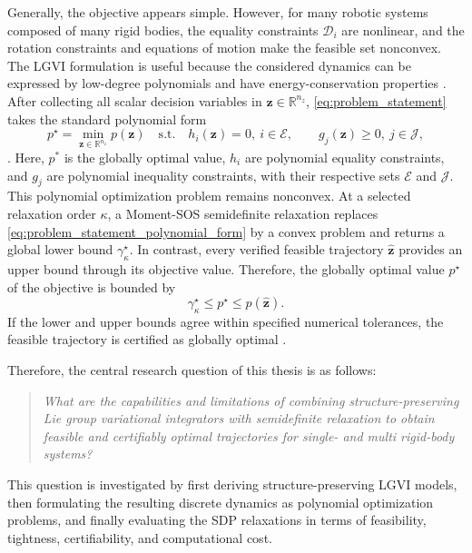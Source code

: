 Generally, the objective appears simple. However, for many robotic systems composed of many rigid bodies, 
the equality constraints $\mathcal D_i$ are nonlinear, and
the rotation constraints and equations of
motion make the feasible set nonconvex. The LGVI formulation is useful because the
considered dynamics can be expressed by low-degree
polynomials and have energy-conservation properties \cite{Sangli2025}. 
After collecting all scalar decision variables in
$\bm{z}\in\mathbb{R}^{n_z}$, \eqref{eq:problem_statement} takes the standard
polynomial form
\begin{equation}
\label{eq:problem_statement_polynomial_form}
p^\star=\min_{\bm{z}\in\mathbb{R}^{n_z}}p(\bm{z})
\quad\text{s.t.}\quad
h_i(\bm{z})=0,\ i\in\mathcal{E},
\qquad
g_j(\bm{z})\geq0,\ j\in\mathcal{J},
\end{equation}
\cite{Yang2024Semidefinite}. Here, $p^*$ is the globally optimal value, $h_i$ are polynomial equality constraints,
and $g_j$ are polynomial inequality constraints, with their respective sets $\mathcal{E}$ and $\mathcal{J}$.
This polynomial optimization problem remains nonconvex. At a selected relaxation
order $\kappa$, a Moment-SOS semidefinite relaxation replaces \eqref{eq:problem_statement_polynomial_form}
by a convex problem and returns a global lower bound $\gamma_\kappa^\star$. In contrast, every
verified feasible trajectory $\hat{\bm{z}}$ provides an upper bound through its objective
value. Therefore, the globally optimal value $p^\star$ of the objective is bounded by
\begin{equation}
\label{eq:problem_statement_bounds}
\gamma_\kappa^\star\leq p^\star\leq p(\hat{\bm{z}}).
\end{equation}
If the lower and upper bounds agree within specified numerical tolerances, the
feasible trajectory is certified as globally optimal \cite{Lasserre2001Global}.

Therefore, the central research question of this thesis is as follows:

\begin{quote}
\emph{What are the capabilities and limitations of combining structure-preserving Lie group variational 
integrators with semidefinite relaxation to obtain feasible and certifiably 
optimal trajectories for single- and multi rigid-body systems?}
\end{quote}

This question is investigated by first deriving structure-preserving LGVI models,
then formulating the resulting discrete dynamics as polynomial optimization
problems, and finally evaluating the SDP relaxations in terms of feasibility,
tightness, certifiability, and computational cost.

